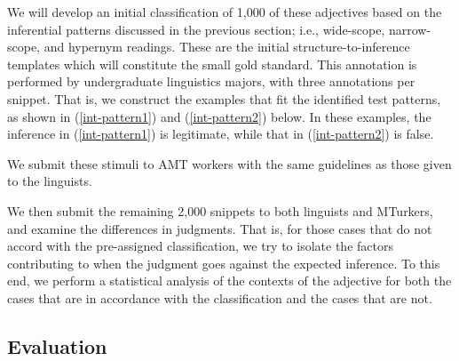 \documentclass[10pt]{article}
\begin{document}
We will develop an initial classification of 1,000 of these adjectives based on the inferential patterns discussed in the previous section; i.e., wide-scope, narrow-scope, and hypernym readings. 
These are the initial structure-to-inference templates which will constitute the small gold standard. This annotation is performed by undergraduate linguistics majors, with three annotations per snippet. 
That is, we construct the examples that fit the identified test patterns, as shown in (\ref{int-pattern1}) and (\ref{int-pattern2}) below. In these examples, the inference in (\ref{int-pattern1}) is legitimate, while that in (\ref{int-pattern2}) is false. 



 \noindent We submit these stimuli to AMT workers with the same guidelines as those given to the linguists. 
 
 We then submit the remaining 2,000 snippets to both linguists and MTurkers, and examine the differences in judgments. That is, for those cases that do not accord with the pre-assigned classification, we try to isolate the factors contributing to when the judgment goes against the expected inference. 
 To this end, we perform a statistical analysis of the contexts of the adjective for both the cases that are in accordance with the classification and the cases that are not. 
 


\subsection{Evaluation}
\end{document}
